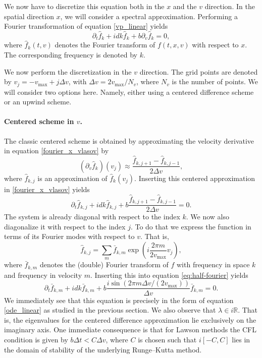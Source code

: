 We now have to discretize this equation both in the $x$ and the $v$ direction. In the spatial direction $x$, we will consider a spectral approximation. Performing a Fourier transformation of equation \eqref{vp_linear} yields
\begin{equation} 
\label{fourier_x_vlasov}
\partial_t \hat{f}_{k} +  i d k\hat{f}_{k} +b \partial_v \hat{f}_{k} = 0,
\end{equation} 
where $\hat{f}_k(t,v)$ denotes the Fourier transform of $f(t,x,v)$ with respect to $x$. The corresponding frequency is denoted by $k$. 

We now perform the discretization in the $v$ direction. The grid points are denoted by $v_j=-v_{\max}+j \Delta v$, with $\Delta v=2v_{\max}/N_v$, where $N_v$ is the number of points. We will consider two options here. Namely, either using a centered difference scheme or an upwind scheme.




\paragraph{Centered scheme in $v$.\\} The classic centered scheme is obtained by approximating the velocity derivative in equation \eqref{fourier_x_vlasov} by
$$
(\partial_v \hat{f}_{k})(v_j) \approx \frac{\hat{f}_{k, j+1}-\hat{f}_{k, j-1}}{2\Delta v},
$$ 
where $\hat{f}_{k,j}$ is an approximation of $\hat{f}_{k}(v_j)$.  Inserting this centered approximation 
in \eqref{fourier_x_vlasov} yields
\begin{equation} \label{eq:half-fourier}
\partial_t \hat{f}_{k,j} +  i d k\hat{f}_{k,j} +b \frac{\hat{f}_{k,j+1} -\hat{f}_{k,j-1} }{2\Delta v} = 0. \end{equation}
The system is already diagonal with respect to the index $k$. We now also diagonalize it with respect to the index $j$. To do that we express the function in terms of its Fourier modes with respect to $v$. That is,
\[ \hat{f}_{k,j} = \sum_m \bar{f}_{k, m}\exp\left(i \frac{2\pi m}{2v_{\max}}  v_j\right), \]
where $\bar{f}_{k,m}$ denotes the (double) Fourier transform of $f$ with frequency in space $k$ and frequency in velocity $m$. Inserting this into equation \eqref{eq:half-fourier} yields
\begin{equation}
\label{discrete_linear_transport}
	\partial_t \bar{f}_{k,m} + i dk\bar{f}_{k,m} +b \frac{i\sin(2\pi m \Delta v/(2v_{\max})) }{\Delta v} \bar{f}_{k,m}= 0.  
\end{equation}
We immediately see that this equation is precisely in the form of equation \eqref{ode_linear} as studied in the previous section. We also observe that $\lambda \in i\mathbb{R}$. That is, the eigenvalues for the centered difference approximation lie exclusively on the imaginary axis. One immediate consequence is that for Lawson methods the CFL condition is given by $b \Delta t < C \Delta v$, where $C$ is chosen such that $i [-C,C]$ lies in the domain of stability of the underlying Runge--Kutta method.



